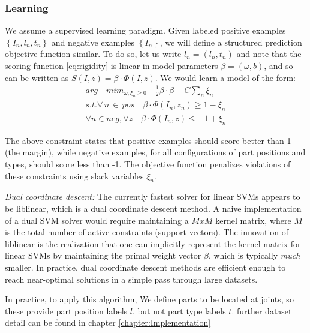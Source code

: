  \subsubsection{Learning}
 We assume a supervised learning paradigm. Given labeled positive examples $\left\{I_n, l_n,t_n\right\}$ 
and negative examples $\left\{I_n\right\}$, we will define a structured prediction objective 
function similar. To do so, let us write $l_n = (l_n, t_n)$ and note that the scoring
function \ref{eq:rigidity} is linear in model parameters $\beta=(\omega,b)$, and so
can be written as $S(I,z)=\beta \cdot \Phi(I,z)$. We would learn a model of the form:
\begin{equation}
\label{eq:learning}
\begin{split}
arg \quad mim_{\omega , \xi_n \geq 0} \quad \frac{1}{2}\beta \cdot \beta + C\sum_n \xi_n \\
s.t. \forall\,n\,\in\,pos \quad \beta \cdot \Phi(I_n, z_n) \geq 1 - \xi_n \\
\forall n \in neg, \forall z \quad \beta \cdot \Phi(I_n,z) \leq -1 + \xi_n
\end{split}
\end{equation}

The above constraint states that positive examples should score better than 1 (the margin),
while negative examples, for all configurations of part positions and types, should
score less than -1. The objective function penalizes violations of these constraints
using slack variables $\xi_n$.

\textit{Dual coordinate descent: } The currently fastest solver for linear SVMs appears to be
liblinear, which is a dual coordinate descent method. A naive implementation of a dual SVM solver would 
require maintaining a $MxM$ kernel matrix, where $M$ is the total number of active constraints
(support vectors). The innovation of liblinear is the realization that one can implicitly
represent the kernel matrix for linear SVMs by maintaining the primal weight vector $\beta$,
which is typically \textit{much} smaller. In practice, dual coordinate descent methods are efficient
enough to reach near-optimal solutions in a simple pass through large datasets.

In practice, to apply this algorithm, We define parts to be located at joints, so these provide
part position labels $l$, but not part type labels $t$. further dataset detail can be found in chapter \ref{chapter:Implementation}

